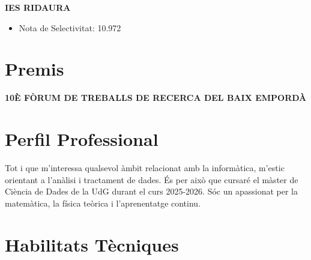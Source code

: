 \documentclass[11pt,a4paper]{article}
\newcommand{\runsubsection}[1]{\color{subheadings}\fontsize{12pt}{12pt}\selectfont\bfseries\uppercase{#1}\normalfont}
\newcommand{\descript}[1]{\color{subheadings}\raggedright\scshape\fontsize{11pt}{13pt}\selectfont{#1 \\}\normalfont}
\newcommand{\location}[1]{\color{headings}\raggedright\fontsize{10pt}{12pt}\selectfont{#1\\}\normalfont}
\newcommand{\sectionsep}{\vspace{8pt}}
\newenvironment{tightemize}{\vspace{-\topsep}\begin{itemize}\itemsep1pt \parskip0pt \parsep0pt}{\end{itemize}\vspace{-\topsep}}
\begin{document}
\begin{multicols}{2}
\runsubsection{IES Ridaura}
\descript{Batxillerat Científic}
\location{2019 – 2021 | Castell-Platja d'Aro}
\sectionsep
\begin{tightemize}
\item Nota de Selectivitat: 10.972
\end{tightemize}

\sectionsep

\section{Premis}

\runsubsection{10è Fòrum de Treballs de Recerca del Baix Empordà}

\descript{Plaques solars fotovoltaiques, Seguiment solar per millorar-ne el rendiment}
\location{2021 | Girona}
\sectionsep




\columnbreak

\section{Perfil Professional}
Tot i que m'interessa qualsevol àmbit relacionat amb la informàtica, m'estic orientant a l'anàlisi i tractament de dades. És per això que cursaré el màster de Ciència de Dades de la UdG durant el curs 2025-2026. Sóc un apassionat per la matemàtica, la física teòrica i l'aprenentatge continu. 

\sectionsep

\section{Habilitats Tècniques}


\end{multicols}
\end{document}
